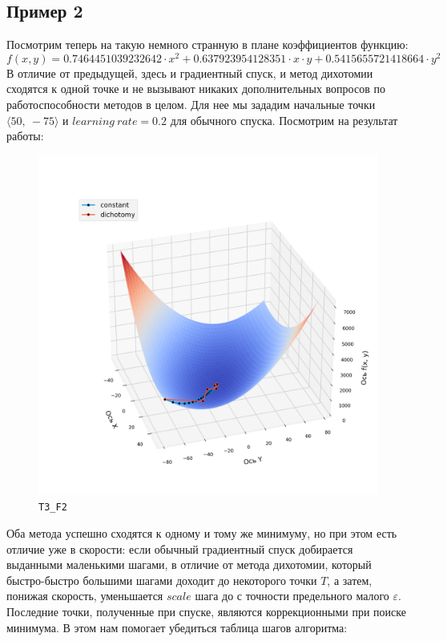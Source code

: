 \documentclass[12pt, a4paper, oneside, final]{article}
\begin{document}
	\subsection*{Пример 2}
	Посмотрим теперь на такую немного странную в плане коэффициентов функцию:
	\[
		f(x, y) = 0.7464451039232642 \cdot x^{2} + 0.637923954128351 \cdot x \cdot y + 0.5415655721418664 \cdot y^{2}
	\]
	В отличие от предыдущей, здесь и градиентный спуск, и метод дихотомии сходятся к одной точке и не вызывают никаких дополнительных вопросов по работоспособности методов в целом. Для нее мы зададим начальные точки $\langle 50, ~ -75\rangle$ и $learning~rate = 0.2$ для обычного спуска. Посмотрим на результат работы:
	\begin{figure}[H]
		\centering
		\includegraphics[scale=0.68]{Image/T3_F2.png}
		\caption*{\texttt{T3\_F2}}
	\end{figure}
	Оба метода успешно сходятся к одному и тому же минимуму, но при этом есть отличие уже в скорости: если обычный градиентный спуск добирается выданными маленькими шагами, в отличие от метода дихотомии, который быстро-быстро большими шагами доходит до некоторого точки $T$, а затем, понижая скорость, уменьшается $scale$ шага до с точности предельного малого $\varepsilon$. Последние точки, полученные при спуске, являются коррекционными при поиске минимума. В этом нам помогает убедиться таблица шагов алгоритма:
\end{document}
